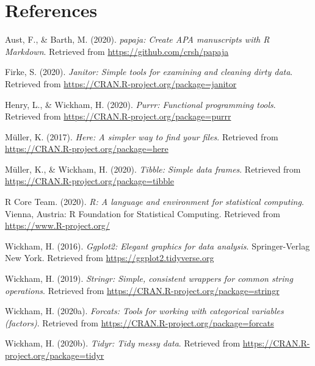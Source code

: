\documentclass[
  english,
  man]{apa6}
\begin{document}
\newpage

\hypertarget{references}{%
\section{References}\label{references}}

\begingroup
\setlength{\parindent}{-0.5in}
\setlength{\leftskip}{0.5in}

\hypertarget{refs}{}
\leavevmode\hypertarget{ref-R-papaja}{}%
Aust, F., \& Barth, M. (2020). \emph{papaja: Create APA manuscripts with R Markdown}. Retrieved from \url{https://github.com/crsh/papaja}

\leavevmode\hypertarget{ref-R-janitor}{}%
Firke, S. (2020). \emph{Janitor: Simple tools for examining and cleaning dirty data}. Retrieved from \url{https://CRAN.R-project.org/package=janitor}

\leavevmode\hypertarget{ref-R-purrr}{}%
Henry, L., \& Wickham, H. (2020). \emph{Purrr: Functional programming tools}. Retrieved from \url{https://CRAN.R-project.org/package=purrr}

\leavevmode\hypertarget{ref-R-here}{}%
Müller, K. (2017). \emph{Here: A simpler way to find your files}. Retrieved from \url{https://CRAN.R-project.org/package=here}

\leavevmode\hypertarget{ref-R-tibble}{}%
Müller, K., \& Wickham, H. (2020). \emph{Tibble: Simple data frames}. Retrieved from \url{https://CRAN.R-project.org/package=tibble}

\leavevmode\hypertarget{ref-R-base}{}%
R Core Team. (2020). \emph{R: A language and environment for statistical computing}. Vienna, Austria: R Foundation for Statistical Computing. Retrieved from \url{https://www.R-project.org/}

\leavevmode\hypertarget{ref-R-ggplot2}{}%
Wickham, H. (2016). \emph{Ggplot2: Elegant graphics for data analysis}. Springer-Verlag New York. Retrieved from \url{https://ggplot2.tidyverse.org}

\leavevmode\hypertarget{ref-R-stringr}{}%
Wickham, H. (2019). \emph{Stringr: Simple, consistent wrappers for common string operations}. Retrieved from \url{https://CRAN.R-project.org/package=stringr}

\leavevmode\hypertarget{ref-R-forcats}{}%
Wickham, H. (2020a). \emph{Forcats: Tools for working with categorical variables (factors)}. Retrieved from \url{https://CRAN.R-project.org/package=forcats}

\leavevmode\hypertarget{ref-R-tidyr}{}%
Wickham, H. (2020b). \emph{Tidyr: Tidy messy data}. Retrieved from \url{https://CRAN.R-project.org/package=tidyr}
\end{document}
